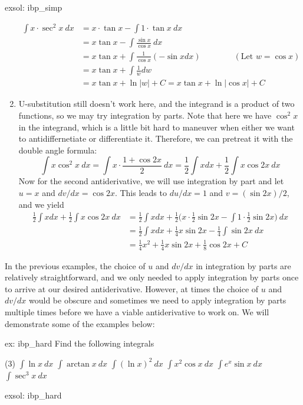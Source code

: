 \begin{exsol}[]{exsol: ibp_simp}
\begin{enumerate}
        \begin{align*}
            \int x \cdot \sec^2x~dx &= x \cdot \tan x - \int 1 \cdot \tan x~dx\\
            &= x \tan x - \int \frac{\sin x}{\cos x}~dx\\
            &= x \tan x + \int \frac{1}{\cos x} (-\sin x dx) \qquad \qquad (\text{Let }w = \cos x)\\
            &= x \tan x + \int \frac{1}{w} dw\\
            &= x \tan x + \ln |w| + C = x\tan x + \ln |\cos x| + C
        \end{align*}
        \item U-substitution still doesn't work here, and the integrand is a product of two functions, so we may try integration by parts.  Note that here we have $\cos^2x$ in the integrand, which is a little bit hard to maneuver when either we want to antidiffernetiate or differentiate it.  Therefore, we can pretreat it with the double angle formula:
        \[\int x \cos^2x~dx = \int x \cdot \frac{1+\cos 2x}{2}~ dx = \frac{1}{2}\int x dx +\frac{1}{2} \int x \cos 2x~dx\]
        Now for the second antiderivative, we will use integration by part and let $u = x$ and $dv/dx = \cos 2x$.  This leads to $du/dx = 1$ and $v = (\sin 2x)/2$, and we yield
        \begin{align*}
            \frac{1}{2}\int x dx +\frac{1}{2} \int x \cos 2x~dx &= \frac{1}{2}\int x dx + \frac{1}{2}\Big(x \cdot \frac{1}{2}\sin 2x - \int 1 \cdot \frac{1}{2}\sin 2x\Big)~dx\\
            &= \frac{1}{2}\int x dx + \frac{1}{4}x\sin 2x - \frac{1}{4}\int \sin 2x~dx\\
            &= \frac{1}{4}x^2 + \frac{1}{4}x\sin 2x + \frac{1}{8} \cos 2x + C
        \end{align*}
    \end{enumerate}
\end{exsol}

In the previous examples, the choice of $u$ and $dv/dx$ in integration by parts are relatively straightforward, and we only needed to apply integration by parts once to arrive at our desired antiderivative.  However, at times the choice of $u$ and $dv/dx$ would be obscure and sometimes we need to apply integration by parts multiple times before we have a viable antiderivative to work on.  We will demonstrate some of the examples below:

\begin{ex}[]{ex: ibp_hard}
    Find the following integrals
    \begin{tasks}(3)
        \task $\int \ln x~dx$
        \task $\int \arctan x~dx$
        \task $\int (\ln x)^2~dx$
        \task $\int x^2 \cos x~dx$
        \task $\int e^x \sin x~dx$
        \task $\int \sec^3 x~dx$
    \end{tasks}
\end{ex}

\begin{exsol}[]{exsol: ibp_hard}
    \lipsum[1-4]
    \lipsum[1-4]
    \lipsum[1-4]
    \lipsum[1-4]
    \lipsum[1-4]
    \lipsum[1-4]
\end{exsol}